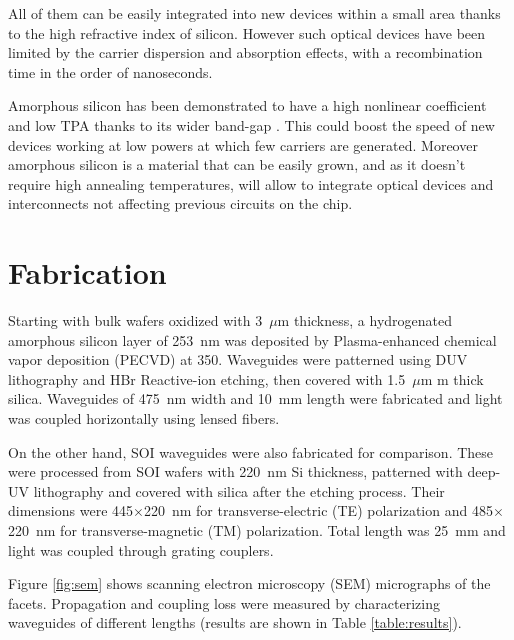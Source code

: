 \documentclass[10pt,letterpaper]{article}
\begin{document}
All of them can be easily integrated into new devices within a small area thanks to the high refractive index of silicon. However such optical devices have been limited by the carrier dispersion and absorption effects, with a recombination time in the order of nanoseconds. 

Amorphous silicon has been demonstrated to have a high nonlinear coefficient \cite{Narayanan2010} and low TPA thanks to its wider band-gap \cite{OLeary1997}. This could boost the speed of new devices working at low powers at which few carriers are generated. Moreover amorphous silicon is a material that can be easily grown, and as it doesn't require high annealing temperatures, will allow to integrate optical devices and interconnects not affecting previous circuits on the chip.




\section{Fabrication}
Starting with bulk wafers oxidized with 3~$\mu \mathrm{m}$ thickness, a hydrogenated amorphous silicon layer of 253~nm was deposited by Plasma-enhanced chemical vapor deposition (PECVD) at 350\textcelsius. Waveguides were patterned using DUV lithography and HBr Reactive-ion etching, then covered with 1.5~$\mu \mathrm{m}$ m thick silica. Waveguides of 475~nm width and 10~mm length were fabricated and light was coupled horizontally using lensed fibers.

On the other hand, SOI waveguides were also fabricated for comparison. These were processed from SOI wafers with 220~nm Si thickness, patterned with deep-UV lithography and covered with silica after the etching process. Their dimensions were  445$\times$220~nm  for transverse-electric (TE) polarization and 485$\times$220~nm for transverse-magnetic (TM) polarization. Total length was 25~mm and light was coupled through grating couplers.

Figure \ref{fig:sem} shows scanning electron microscopy (SEM) micrographs of the facets. Propagation and coupling loss were measured by characterizing waveguides of different lengths (results are shown in Table \ref{table:results}). 


\end{document}
